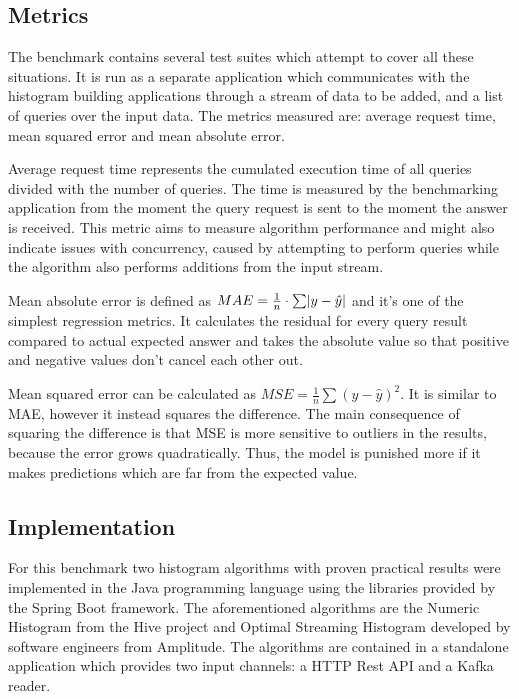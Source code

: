 \documentclass[12pt]{article}
\begin{document}
	\subsection{Metrics}
	The benchmark contains several test suites which attempt to cover all these 
	situations. It is run as a separate application which communicates with 
	the histogram building applications through a stream of data to be added, 
	and a list of queries over the input data. The metrics measured are: average 
	request time, mean squared error and mean absolute error.

	Average request time represents the cumulated execution time of all queries 
	divided with the number of queries. The time is measured by the benchmarking 
	application from the moment the query request is sent to the moment the answer 
	is received. This metric aims to measure algorithm performance and might 
	also indicate issues with concurrency, caused by attempting to perform 
	queries while the algorithm also performs additions from the input stream.
	
	Mean absolute error\cite{errormetrics} is defined as $ MAE = \frac{1}{n} \cdot \sum \abs{y - \hat{y}} $
	and it's one of the simplest regression metrics. It calculates the residual for 
	every query result compared to actual expected answer and takes the absolute 
	value so that positive and negative values don't cancel each other out.

	Mean squared error\cite{errormetrics} can be calculated as $ MSE = \frac{1}{n}
	\sum (y - \hat{y})^2 $. It is similar to MAE, however it instead squares the difference.
	The main consequence of squaring the difference is that MSE is more sensitive 
	to outliers in the results, because the error grows quadratically. Thus, the model 
	is punished more if it makes predictions which are far from the expected value.

	\subsection{Implementation}
	For this benchmark two histogram algorithms with proven practical results 
	were implemented in the Java programming language using the libraries 
	provided by the Spring Boot framework. 
	The aforementioned algorithms are the Numeric Histogram\cite{HiveImplementation} 
	from the Hive project and Optimal Streaming Histogram\cite{OSHistograms} developed 
	by software engineers from Amplitude. The algorithms are contained in a standalone 
	application which provides two input channels: a HTTP Rest API and a Kafka reader.
\end{document}
